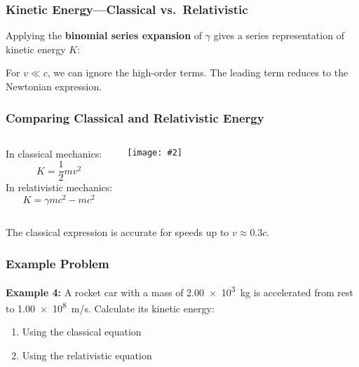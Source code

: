 \documentclass[12pt,compress,aspectratio=169]{beamer}
\newcommand{\pic}[2]{\texttt{[image: \#2]}}
\begin{document}
\begin{frame}
  \frametitle{Kinetic Energy---Classical vs.\ Relativistic}
  Applying the \textbf{binomial series expansion} of $\gamma$ gives a
  series representation of kinetic energy $K$:

  
  For $v\ll c$, we can ignore the high-order terms. The leading term reduces to
  the Newtonian expression.
\end{frame}


\begin{frame}
  \frametitle{Comparing Classical and Relativistic Energy}
  \begin{columns}
    In classical mechanics:
    {\Large
      \begin{displaymath}
        K=\frac{1}{2} mv^2
      \end{displaymath}
    }
    In relativistic mechanics:
    {\Large
      \begin{displaymath}
        K=\gamma mc^2-mc^2
      \end{displaymath}
    }
    
    \pic{.85}{graphics/e_k.png}
  \end{columns}

  The classical expression is accurate for speeds up to $v\approx 0.3c$.
\end{frame}

\begin{frame}
  \frametitle{Example Problem}
  \textbf{Example 4:} A rocket car with a mass of \SI{2.00e3}{kg} is accelerated
  from rest to \SI{1.00e8}{m/s}. Calculate its kinetic energy:
  \begin{enumerate}
  \item Using the classical equation
  \item Using the relativistic equation
  \end{enumerate}
\end{frame}
\end{document}
